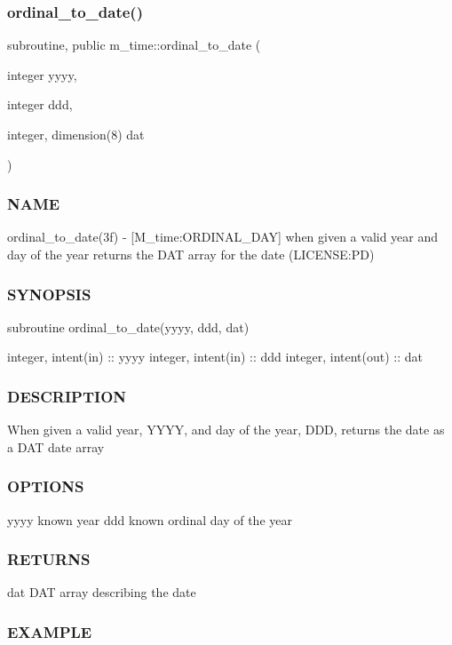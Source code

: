 \subsubsection{\texorpdfstring{ordinal\+\_\+to\+\_\+date()}{ordinal\_to\_date()}}
{\footnotesize\ttfamily subroutine, public m\+\_\+time\+::ordinal\+\_\+to\+\_\+date (\begin{DoxyParamCaption}\item[{integer}]{yyyy,  }\item[{integer}]{ddd,  }\item[{integer, dimension(8)}]{dat }\end{DoxyParamCaption})}



\subsubsection*{N\+A\+ME}

ordinal\+\_\+to\+\_\+date(3f) -\/ \mbox{[}M\+\_\+time\+:O\+R\+D\+I\+N\+A\+L\+\_\+\+D\+AY\mbox{]} when given a valid year and day of the year returns the D\+AT array for the date (L\+I\+C\+E\+N\+SE\+:PD) \subsubsection*{S\+Y\+N\+O\+P\+S\+IS}

subroutine ordinal\+\_\+to\+\_\+date(yyyy, ddd, dat)

integer, intent(in) \+:\+: yyyy integer, intent(in) \+:\+: ddd integer, intent(out) \+:\+: dat \subsubsection*{D\+E\+S\+C\+R\+I\+P\+T\+I\+ON}

When given a valid year, Y\+Y\+YY, and day of the year, D\+DD, returns the date as a D\+AT date array \subsubsection*{O\+P\+T\+I\+O\+NS}

yyyy known year ddd known ordinal day of the year \subsubsection*{R\+E\+T\+U\+R\+NS}

dat D\+AT array describing the date \subsubsection*{E\+X\+A\+M\+P\+LE}

